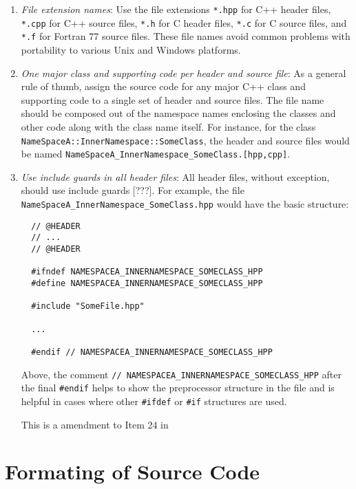 \begin{enumerate}

{}\item\textit{File extension names}: Use the file extensions {}\texttt{*.hpp}
for C++ header files, {}\texttt{*.cpp} for C++ source files, {}\texttt{*.h}
for C header files, {}\texttt{*.c} for C source files, and {}\texttt{*.f} for
Fortran 77 source files.  These file names avoid common problems with
portability to various Unix and Windows platforms.

{}\item\textit{One major class and supporting code per header and source
file}: As a general rule of thumb, assign the source code for any major C++
class and supporting code to a single set of header and source files.  The
file name should be composed out of the namespace names enclosing the classes
and other code along with the class name itself.  For instance, for the class
{}\texttt{NameSpaceA\-::InnerNamespace\-::SomeClass}, the header and source
files would be named
{}\texttt{NameSpaceA\-\_InnerNamespace\-\_SomeClass.[hpp,cpp]}.

{}\item\textit{Use include guards in all header files}: All header files,
without exception, should use include guards [???].  For example, the file
{}\texttt{NameSpaceA\-\_InnerNamespace\-\_SomeClass.hpp} would have the basic
structure:

{\small\begin{verbatim}
  // @HEADER
  // ...
  // @HEADER

  #ifndef NAMESPACEA_INNERNAMESPACE_SOMECLASS_HPP
  #define NAMESPACEA_INNERNAMESPACE_SOMECLASS_HPP

  #include "SomeFile.hpp"

  ...

  #endif // NAMESPACEA_INNERNAMESPACE_SOMECLASS_HPP
\end{verbatim}}

Above, the comment {}\texttt{//
NAMESPACEA\-\_INNERNAMESPACE\-\_SOMECLASS\-\_HPP} after the final
{}\texttt{\#endif} helps to show the preprocessor structure in the file and is
helpful in cases where other {}\texttt{\#ifdef} or {}\texttt{\#if} structures
are used.

This is a amendment to Item 24 in {}\cite{C++CodingStandards05}

\end{enumerate}

%
\section{Formating of Source Code}
\label{thyracodingguidelines:formatting:sec}
%

